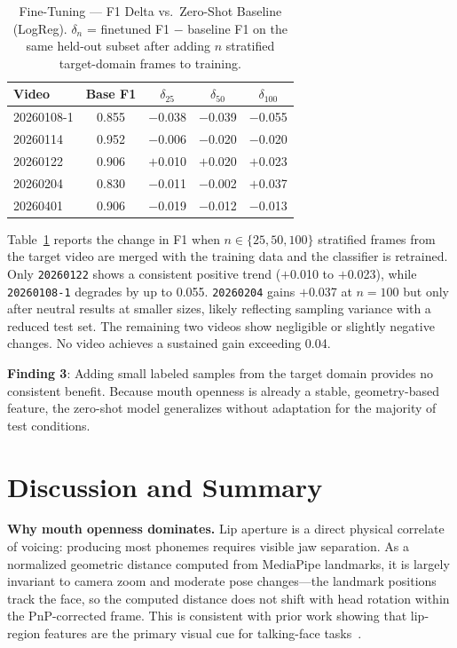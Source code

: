 \documentclass[conference]{IEEEtran}
\begin{document}
\begin{table}[t]
\caption{Fine-Tuning — F1 Delta vs.\ Zero-Shot Baseline (LogReg).
         $\delta_n$ = finetuned F1 $-$ baseline F1 on the same held-out subset
         after adding $n$ stratified target-domain frames to training.}
\label{tab:finetuning}
\centering
\setlength{\tabcolsep}{4pt}
\begin{tabular}{lcccc}
\toprule
\textbf{Video} & \textbf{Base F1} &
\textbf{$\delta_{25}$} & \textbf{$\delta_{50}$} & \textbf{$\delta_{100}$} \\
\midrule
20260108-1 & 0.855 & $-$0.038 & $-$0.039 & $-$0.055 \\
20260114   & 0.952 & $-$0.006 & $-$0.020 & $-$0.020 \\
20260122   & 0.906 & $+$0.010 & $+$0.020 & $+$0.023 \\
20260204   & 0.830 & $-$0.011 & $-$0.002 & $+$0.037 \\
20260401   & 0.906 & $-$0.019 & $-$0.012 & $-$0.013 \\
\bottomrule
\end{tabular}
\end{table}

Table~\ref{tab:finetuning} reports the change in F1 when $n \in \{25,50,100\}$
stratified frames from the target video are merged with the training data and
the classifier is retrained.
Only \texttt{20260122} shows a consistent positive trend ($+$0.010 to $+$0.023),
while \texttt{20260108-1} degrades by up to 0.055.
\texttt{20260204} gains $+$0.037 at $n\!=\!100$ but only after neutral results
at smaller sizes, likely reflecting sampling variance with a reduced test set.
The remaining two videos show negligible or slightly negative changes.
No video achieves a sustained gain exceeding 0.04.

\textbf{Finding 3}: Adding small labeled samples from the target domain provides
no consistent benefit. Because mouth openness is already a stable, geometry-based
feature, the zero-shot model generalizes without adaptation for the majority of
test conditions.

\section{Discussion and Summary}
\label{sec:discussion}

\textbf{Why mouth openness dominates.}
Lip aperture is a direct physical correlate of voicing: producing most phonemes
requires visible jaw separation.
As a normalized geometric distance computed from MediaPipe landmarks, it is
largely invariant to camera zoom and moderate pose changes—the landmark positions
track the face, so the computed distance does not shift with head rotation within
the PnP-corrected frame.
This is consistent with prior work showing that lip-region features are the
primary visual cue for talking-face tasks~\cite{chung2016out,roth2020ava}.
\end{document}
